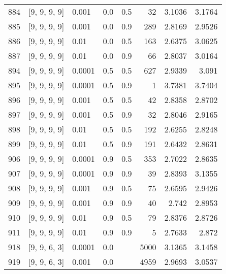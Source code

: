 \begin{longtable}{lllrrrrr}
  884 &       [9, 9, 9, 9] &                       0.001 &      0.0 & 0.5 &   32 &   3.1036 &   3.1764 \\
  885 &       [9, 9, 9, 9] &                       0.001 &      0.0 & 0.9 &  289 &   2.8169 &   2.9526 \\
  886 &       [9, 9, 9, 9] &                        0.01 &      0.0 & 0.5 &  163 &   2.6375 &   3.0625 \\
  887 &       [9, 9, 9, 9] &                        0.01 &      0.0 & 0.9 &   66 &   2.8037 &   3.0164 \\
  894 &       [9, 9, 9, 9] &                      0.0001 &      0.5 & 0.5 &  627 &   2.9339 &    3.091 \\
  895 &       [9, 9, 9, 9] &                      0.0001 &      0.5 & 0.9 &    1 &   3.7381 &   3.7404 \\
  896 &       [9, 9, 9, 9] &                       0.001 &      0.5 & 0.5 &   42 &   2.8358 &   2.8702 \\
  897 &       [9, 9, 9, 9] &                       0.001 &      0.5 & 0.9 &   32 &   2.8046 &   2.9165 \\
  898 &       [9, 9, 9, 9] &                        0.01 &      0.5 & 0.5 &  192 &   2.6255 &   2.8248 \\
  899 &       [9, 9, 9, 9] &                        0.01 &      0.5 & 0.9 &  191 &   2.6432 &   2.8631 \\
  906 &       [9, 9, 9, 9] &                      0.0001 &      0.9 & 0.5 &  353 &   2.7022 &   2.8635 \\
  907 &       [9, 9, 9, 9] &                      0.0001 &      0.9 & 0.9 &   39 &   2.8393 &   3.1355 \\
  908 &       [9, 9, 9, 9] &                       0.001 &      0.9 & 0.5 &   75 &   2.6595 &   2.9426 \\
  909 &       [9, 9, 9, 9] &                       0.001 &      0.9 & 0.9 &   40 &    2.742 &   2.8953 \\
  910 &       [9, 9, 9, 9] &                        0.01 &      0.9 & 0.5 &   79 &   2.8376 &   2.8726 \\
  911 &       [9, 9, 9, 9] &                        0.01 &      0.9 & 0.9 &    5 &   2.7633 &    2.872 \\
  918 &       [9, 9, 6, 3] &                      0.0001 &      0.0 &     & 5000 &   3.1365 &   3.1458 \\
  919 &       [9, 9, 6, 3] &                       0.001 &      0.0 &     & 4959 &   2.9693 &   3.0537 \\

\end{longtable}
